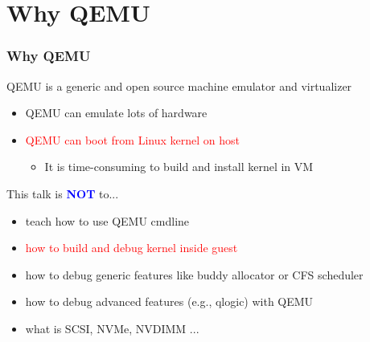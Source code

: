 \documentclass[aspectratio=169]{beamer}
\begin{document}

\section{Why QEMU}
\begin{frame}
\frametitle{Why QEMU}
\large
QEMU is a generic and open source machine emulator and virtualizer
\begin{itemize}
\item QEMU can emulate lots of hardware
\item \textcolor{red}{QEMU can boot from Linux kernel on host}
    \begin{itemize}
	\item It is time-consuming to build and install kernel in VM
    \end{itemize}
\end{itemize}

This talk is \textbf{\textcolor{blue}{NOT}} to...
\begin{itemize}
\item teach how to use QEMU cmdline
\item \textcolor{red}{how to build and debug kernel inside guest}
\item how to debug generic features like buddy allocator or CFS scheduler
\item how to debug advanced features (e.g., qlogic) with QEMU
\item what is SCSI, NVMe, NVDIMM ...
\end{itemize}			
\end{frame}

\end{document}
